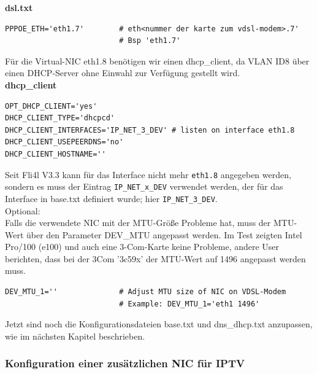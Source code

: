 \noindent \textbf{dsl.txt}

\begin{example}
\begin{verbatim}
PPPOE_ETH='eth1.7'        # eth<nummer der karte zum vdsl-modem>.7'
                          # Bsp 'eth1.7'
\end{verbatim}
\end{example}

\noindent Für die Virtual-NIC eth1.8 benötigen wir einen dhcp\_client, da VLAN
ID8 über einen DHCP-Server ohne Einwahl zur Verfügung gestellt wird.\\

\noindent \textbf{dhcp\_client}

\begin{example}
\begin{verbatim}
OPT_DHCP_CLIENT='yes'
DHCP_CLIENT_TYPE='dhcpcd'
DHCP_CLIENT_INTERFACES='IP_NET_3_DEV' # listen on interface eth1.8
DHCP_CLIENT_USEPEERDNS='no'
DHCP_CLIENT_HOSTNAME=''
\end{verbatim}
\end{example}

Seit Fli4l V3.3 kann für das Interface nicht mehr \texttt{eth1.8} angegeben
werden, sondern es muss der Eintrag \texttt{IP\_NET\_x\_DEV} verwendet werden,
der für das Interface in base.txt definiert wurde; hier
\texttt{IP\_NET\_3\_DEV}.\\

\noindent Optional:\\
Falls die verwendete NIC mit der MTU-Größe Probleme hat, muss der MTU-Wert über
den Parameter DEV\_MTU angepasst werden. Im Test zeigten Intel Pro/100 (e100)
und auch eine 3-Com-Karte keine Probleme, andere User berichten, dass bei der
3Com '3c59x' der MTU-Wert auf 1496 angepasst werden muss.

\begin{example}
\begin{verbatim}
DEV_MTU_1=''              # Adjust MTU size of NIC on VDSL-Modem
                          # Example: DEV_MTU_1='eth1 1496'
\end{verbatim}
\end{example}

Jetzt sind noch die Konfigurationsdateien base.txt und dns\_dhcp.txt anzupassen,
wie im nächsten Kapitel beschrieben.\\

\subsubsection{Konfiguration einer zusätzlichen NIC für IPTV}

